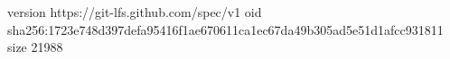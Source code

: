 version https://git-lfs.github.com/spec/v1
oid sha256:1723e748d397defa95416f1ae670611ca1ec67da49b305ad5e51d1afcc931811
size 21988
